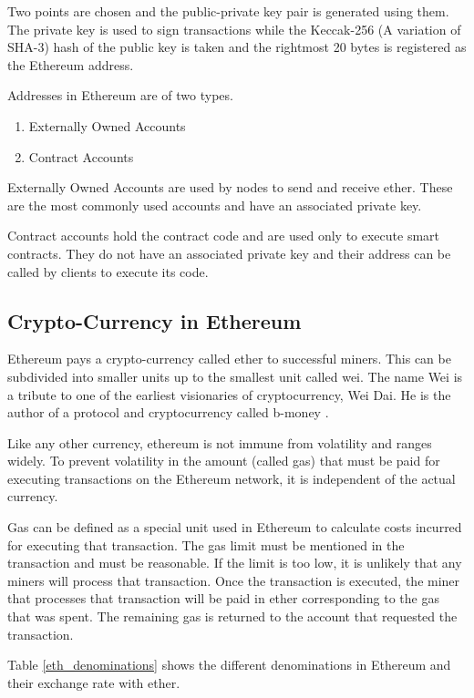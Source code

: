 \documentclass[11pt,openright]{report}
\begin{document}
Two points are chosen and the public-private key pair is generated using them. The private key is used to sign transactions while the Keccak-256 (A variation of SHA-3) hash of the public key is taken and the rightmost 20 bytes is registered as the Ethereum address.

Addresses in Ethereum are of two types.
\begin{enumerate}
    \item Externally Owned Accounts
    \item Contract Accounts
\end{enumerate}

Externally Owned Accounts are used by nodes to send and receive ether. These are the most commonly used accounts and have an associated private key.

Contract accounts hold the contract code and are used only to execute smart contracts. They do not have an associated private key and their address can be called by clients to execute its code.


\subsection{Crypto-Currency in Ethereum}
Ethereum pays a crypto-currency called ether to successful miners. This can be subdivided into smaller units up to the smallest unit called wei. The name Wei is a tribute to one of the earliest visionaries of cryptocurrency, Wei Dai. He is the author of a protocol and cryptocurrency called b-money \cite{dai1998bmoney}.

Like any other currency, ethereum is not immune from volatility and ranges widely. To prevent volatility in the amount (called gas) that must be paid for executing transactions on the Ethereum network, it is independent of the actual currency. 

Gas can be defined as a special unit used in Ethereum to calculate costs incurred for executing that transaction. The gas limit must be mentioned in the transaction and must be reasonable. If the limit is too low, it is unlikely that any miners will process that transaction. Once the transaction is executed, the miner that processes that transaction will be paid in ether corresponding to the gas that was spent. The remaining gas is returned to the account that requested the transaction.

Table \ref{eth_denominations} shows the different denominations in Ethereum and their exchange rate with ether.
\end{document}
